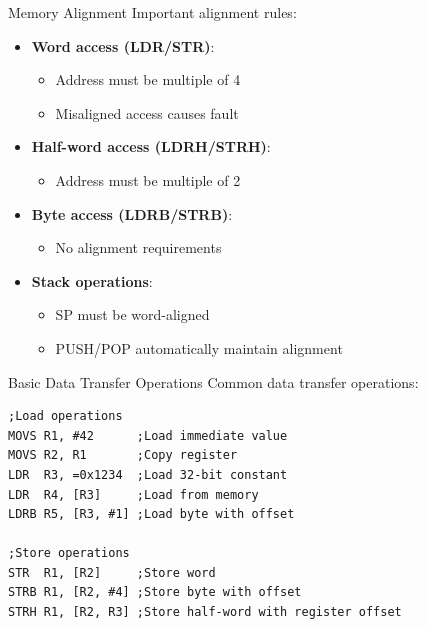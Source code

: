 \begin{concept}{Memory Alignment}
Important alignment rules:
\begin{itemize}
  \item \textbf{Word access (LDR/STR)}:
    \begin{itemize}
      \item Address must be multiple of 4
      \item Misaligned access causes fault
    \end{itemize}
  \item \textbf{Half-word access (LDRH/STRH)}:
    \begin{itemize}
      \item Address must be multiple of 2
    \end{itemize}
  \item \textbf{Byte access (LDRB/STRB)}:
    \begin{itemize}
      \item No alignment requirements
    \end{itemize}
  \item \textbf{Stack operations}:
    \begin{itemize}
      \item SP must be word-aligned
      \item PUSH/POP automatically maintain alignment
    \end{itemize}
\end{itemize}
\end{concept}

\begin{example2}{Basic Data Transfer Operations}
Common data transfer operations:
\begin{lstlisting}[language=armasm, style=basesmol]
;Load operations
MOVS R1, #42      ;Load immediate value
MOVS R2, R1       ;Copy register
LDR  R3, =0x1234  ;Load 32-bit constant
LDR  R4, [R3]     ;Load from memory
LDRB R5, [R3, #1] ;Load byte with offset

;Store operations
STR  R1, [R2]     ;Store word
STRB R1, [R2, #4] ;Store byte with offset
STRH R1, [R2, R3] ;Store half-word with register offset
\end{lstlisting}
\end{example2}


